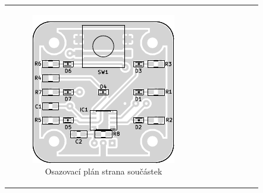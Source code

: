   
\begin{table}[H]
  \begin{center}
    \begin{tabular}{c c}
      \begin{minipage}{0.48\textwidth}
        \begin{figure}[H]
          \centering
          \includegraphics[width=\textwidth]{../design/svg/osazovak_top.pdf}
          \caption{Osazovací plán strana součástek}
          \label{img:2}
        \end{figure}
      \end{minipage}
  			&  				
      \begin{minipage}{0.48\textwidth}
        \begin{figure}[H]
          \centering

\end{figure}
\end{minipage}
\end{tabular}
\end{center}
\end{table}
